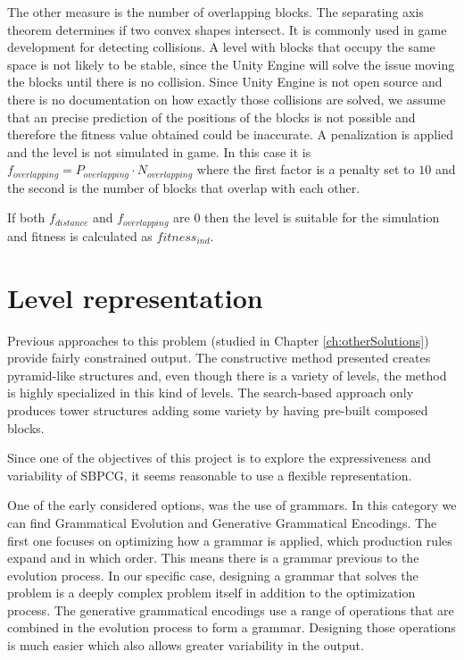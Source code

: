 The other measure is the number of overlapping blocks. The separating axis theorem\cite{ericson2004real} determines if two convex shapes intersect. It is commonly used in game development for detecting collisions. A level with blocks that occupy the same space is not likely to be stable, since the Unity Engine will solve the issue moving the blocks until there is no collision. Since Unity Engine is not open source and there is no documentation on how exactly those collisions are solved, we assume that an precise prediction of the positions of the blocks is not possible and therefore the fitness value obtained could be inaccurate. A penalization is applied and the level is not simulated in game. In this case it is $f_{overlapping} = P_{overlapping} \cdot N_{overlapping}$ where the first factor is a penalty set to $10$ and the second is the number of  blocks that overlap with each other. 

If both $f_{distance}$ and $f_{overlapping}$ are $0$ then the level is suitable for the simulation and fitness is calculated as $fitness_{ind}$.
\section{Level representation}

Previous approaches to this problem (studied in Chapter \ref{ch:otherSolutions}) provide fairly constrained output. The constructive method presented creates pyramid-like structures and, even though there is a variety of levels, the method is highly specialized in this kind of levels. The search-based approach only produces tower structures adding some variety by having pre-built composed blocks. 

Since one of the objectives of this project is to explore the expressiveness and variability of \acs{SBPCG}, it seems reasonable to use a flexible representation. 

One of the early considered options, was the use of grammars. In this category we can find Grammatical Evolution\cite{lourencco2015sge} and Generative Grammatical Encodings\cite{hornby2001advantages}. The first one focuses on optimizing how a grammar is applied, which production rules expand and in which order. This means there is a grammar previous to the evolution process. In our specific case, designing a grammar that solves the problem is a deeply complex problem itself in addition to the optimization process. The generative grammatical encodings use a range of operations that are combined in the evolution process to form a grammar. Designing those operations is much easier which also allows greater variability in the output. 

